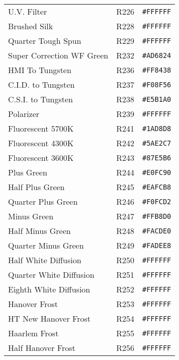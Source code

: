 \documentclass[a4paper]{article}
\begin{document}
\begin{longtable}{|l|l|r|}
U.V. Filter & R226 & \texttt{\#FFFFFF} \cellcolor[HTML]{FFFFFF} \\
Brushed Silk & R228 & \texttt{\#FFFFFF} \cellcolor[HTML]{FFFFFF} \\
Quarter Tough Spun & R229 & \texttt{\#FFFFFF} \cellcolor[HTML]{FFFFFF} \\
Super Correction WF Green & R232 & \texttt{\#AD6824} \cellcolor[HTML]{AD6824} \\
HMI To Tungsten & R236 & \texttt{\#FF8438} \cellcolor[HTML]{FF8438} \\
C.I.D. to Tungsten & R237 & \texttt{\#F08F56} \cellcolor[HTML]{F08F56} \\
C.S.I. to Tungsten & R238 & \texttt{\#E5B1A0} \cellcolor[HTML]{E5B1A0} \\
Polarizer & R239 & \texttt{\#FFFFFF} \cellcolor[HTML]{FFFFFF} \\
Fluorescent 5700K & R241 & \texttt{\#1AD8D8} \cellcolor[HTML]{1AD8D8} \\
Fluorescent 4300K & R242 & \texttt{\#5AE2C7} \cellcolor[HTML]{5AE2C7} \\
Fluorescent 3600K & R243 & \texttt{\#87E5B6} \cellcolor[HTML]{87E5B6} \\
Plus Green & R244 & \texttt{\#E0FC90} \cellcolor[HTML]{E0FC90} \\
Half Plus Green & R245 & \texttt{\#EAFCB8} \cellcolor[HTML]{EAFCB8} \\
Quarter Plus Green & R246 & \texttt{\#F0FCD2} \cellcolor[HTML]{F0FCD2} \\
Minus Green & R247 & \texttt{\#FFB8D0} \cellcolor[HTML]{FFB8D0} \\
Half Minus Green & R248 & \texttt{\#FACDE0} \cellcolor[HTML]{FACDE0} \\
Quarter Minus Green & R249 & \texttt{\#FADEE8} \cellcolor[HTML]{FADEE8} \\
Half White Diffusion & R250 & \texttt{\#FFFFFF} \cellcolor[HTML]{FFFFFF} \\
Quarter White Diffusion & R251 & \texttt{\#FFFFFF} \cellcolor[HTML]{FFFFFF} \\
Eighth White Diffusion & R252 & \texttt{\#FFFFFF} \cellcolor[HTML]{FFFFFF} \\
Hanover Frost & R253 & \texttt{\#FFFFFF} \cellcolor[HTML]{FFFFFF} \\
HT New Hanover Frost & R254 & \texttt{\#FFFFFF} \cellcolor[HTML]{FFFFFF} \\
Haarlem Frost & R255 & \texttt{\#FFFFFF} \cellcolor[HTML]{FFFFFF} \\
Half Hanover Frost & R256 & \texttt{\#FFFFFF} \cellcolor[HTML]{FFFFFF} \\

\end{longtable}
\end{document}
